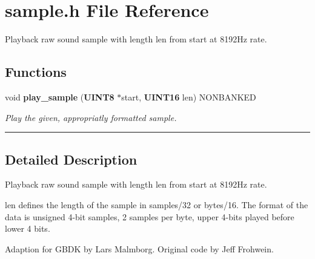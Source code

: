 \section{sample.h File Reference}
\label{sample.h}
Playback raw sound sample with length len from start at 8192Hz rate. 


\subsection*{Functions}
\begin{CompactItemize}
\item 
\label{sample.h_a0}
void {\bf play\_\-sample} ({\bf UINT8} $\ast$start, {\bf UINT16} len) NONBANKED
\begin{CompactList}\small\item\em Play the given, appropriatly formatted sample.\item\end{CompactList}

\end{CompactItemize}
\vspace{0.4cm}\hrule\vspace{0.2cm}
\subsection*{Detailed Description}
Playback raw sound sample with length len from start at 8192Hz rate.

len defines the length of the sample in samples/32 or bytes/16. The format of the data is unsigned 4-bit samples, 2 samples per byte, upper 4-bits played before lower 4 bits.

Adaption for GBDK by Lars Malmborg. Original code by Jeff Frohwein. 